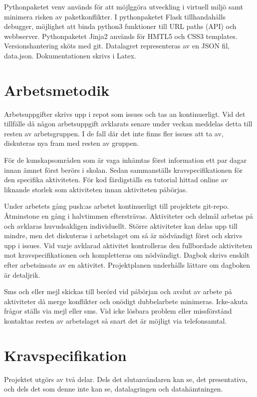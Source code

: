 \documentclass{TDP003mall}
\begin{document}
Pythonpaketet venv används för att möjlggöra utveckling i virtuell miljö samt minimera risken av paketkonflikter.
I pythonpaketet Flask tillhandahålls debugger, möjlighet att binda python3 funktioner till URL paths (API) och webbserver.
Pythonpaketet Jinja2 används för HMTL5 och CSS3 templates.
Versionshantering sköts med git.
Datalagret representeras av en JSON fil, data.json.
Dokumentationen skrivs i Latex.

\newpage

\section{Arbetsmetodik}
Arbetsuppgifter skrivs upp i repot som issues och tas an kontinuerligt. Vid det tillfälle då någon arbetsuppgift avklarats senare under veckan meddelas detta till resten av arbetsgruppen. I de fall där det inte finns fler issues att ta av, diskuteras nya fram med resten av gruppen.

För de kunskapsområden som är vaga inhämtas först information ett par dagar innan ämnet först berörs i skolan. Sedan sammanställs kravspecifikationen för den specifika aktiviteten. För kod färdigställs en tutorial hittad online av liknande storlek som aktiviteten innan aktiviteten påbörjas.

Under arbetets gång push:as arbetet kontinuerligt till projektets git-repo. Åtminstone en gång i halvtimmen eftersträvas. Aktiviteter och delmål arbetas på och avklaras huvudsakligen individuellt. Större aktiviteter kan delas upp till mindre, men det diskuteras i arbetslaget om så är nödvändigt först och skrivs upp i issues. Vid varje avklarad aktivitet kontrolleras den fullbordade aktiviteten mot kravspecifikationen och kompletteras om nödvändigt. Dagbok skrivs enskilt efter arbetsinsats av en aktivitet. Projektplanen underhålls lättare om dagboken är detaljrik.

Sms och eller mejl skickas till berörd vid påbörjan och avslut av arbete på aktiviteter då merge konflikter och onödigt dubbelarbete minimeras. Icke-akuta frågor ställs via mejl eller sms. Vid icke lösbara problem eller missförstånd kontaktas resten av arbetslaget så snart det är möjligt via telefonsamtal.

\section{Kravspecifikation}
Projektet utgörs av två delar. Dels det slutanvändaren kan se, det presentativa,
och dels det som denne inte kan se, datalagringen och datahämtningen.
\end{document}

